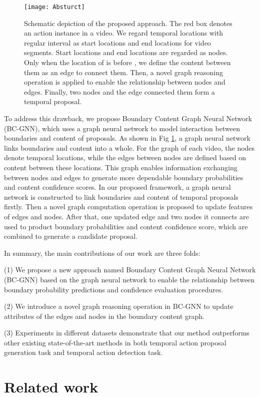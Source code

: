\documentclass[runningheads]{llncs}
\begin{document}
\begin{figure}
\centering
\texttt{[image: Absturct]}
\setlength{\belowcaptionskip}{-.0cm}
\caption{ Schematic depiction of the proposed approach. The red box denotes an action instance in a video. We regard temporal locations with regular interval as start locations and end locations for video segments. Start locations  and end locations  are regarded as nodes. Only when the location of  is before , we define the content between them as an edge to connect them. Then, a novel graph reasoning operation is applied to enable the relationship between nodes and edges. Finally, two nodes and the edge connected them form a temporal proposal.}
\label{introduct}
\end{figure}
To address this drawback, we propose Boundary Content Graph Neural Network (BC-GNN), which uses a graph neural network to model interaction between boundaries and content of proposals. As shown in Fig \ref{introduct}, a graph neural network links boundaries and content into a whole. For the graph of each video, the nodes denote temporal locations, while the edges between nodes are defined based on content between these locations. This graph enables information exchanging between nodes and edges to generate more dependable boundary probabilities and content confidence scores. In our proposed framework, a graph neural network is constructed to link boundaries and content of temporal proposals firstly.  Then a novel graph computation operation is proposed to update features of edges and nodes. After that, one updated edge and two nodes it connects are used to product boundary probabilities and content confidence score, which are combined to generate a candidate proposal.

In summary, the main contributions of our work are three folds:

(1) We propose a new approach named Boundary Content Graph Neural Network (BC-GNN) based on the graph neural network to enable the relationship between boundary probability predictions and confidence evaluation procedures.

(2) We introduce a novel graph reasoning operation in BC-GNN to update attributes of the edges and nodes in the boundary content graph.

(3) Experiments in different datasets demonstrate that our method outperforms other existing state-of-the-art methods in both temporal action proposal generation task and temporal action detection task.


\section{Related work}
\end{document}
